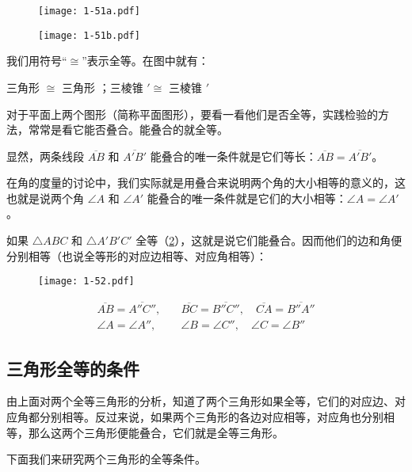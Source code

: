 \begin{figure}
  \begin{minipage}{\linewidth}\centering
		\texttt{[image: 1-51a.pdf]}
		\subcaption{}\label{fig:1-51a}
	\end{minipage}
  \begin{minipage}{\linewidth}\centering
		\texttt{[image: 1-51b.pdf]}
		\subcaption{}\label{fig:1-51b}
	\end{minipage}
	\caption{}\label{fig:1-51}
\end{figure}

我们用符号“$\cong$”表示全等。在图中就有：
\begin{center}
	三角形  $\cong$ 三角形 ；\qquad 三棱锥 $'\cong$ 三棱锥 $'$
\end{center}

对于平面上两个图形（简称平面图形），要看一看他们是否全等，实践检验的方法，常常是看它能否叠合。能叠合的就全等。

显然，两条线段 $\overline{AB}$ 和 $\overline{A'B'}$ 能叠合的唯一条件就是它们等长：$\overline{AB}=\overline{A'B'}$。

在角的度量的讨论中，我们实际就是用叠合来说明两个角的大小相等的意义的，这也就是说两个角 $\angle A$ 和 $\angle A'$ 能叠合的唯一条件就是它们的大小相等：$\angle A=\angle A'$。

如果 $\triangle ABC$ 和 $\triangle A'B'C'$ 全等（\cref{fig:1-52}），这就是说它们能叠合。因而他们的边和角便分别相等（也说全等形的对应边相等、对应角相等）：
\begin{figure}
  \texttt{[image: 1-52.pdf]}
	\caption{}\label{fig:1-52}
\end{figure}
\[\begin{split}
\overline{AB}=\overline{A''C''},&\quad \overline{BC}=\overline{B''C''},\quad \overline{CA}=\overline{B''A''}\\
\angle A=\angle A'',&\quad \angle B=\angle C'',\quad \angle C=\angle B''
\end{split}\]

\subsection{三角形全等的条件}
由上面对两个全等三角形的分析，知道了两个三角形如果全等，它们的对应边、对应角都分别相等。反过来说，如果两个三角形的各边对应相等，对应角也分别相等，那么这两个三角形便能叠合，它们就是全等三角形。

下面我们来研究两个三角形的全等条件。

